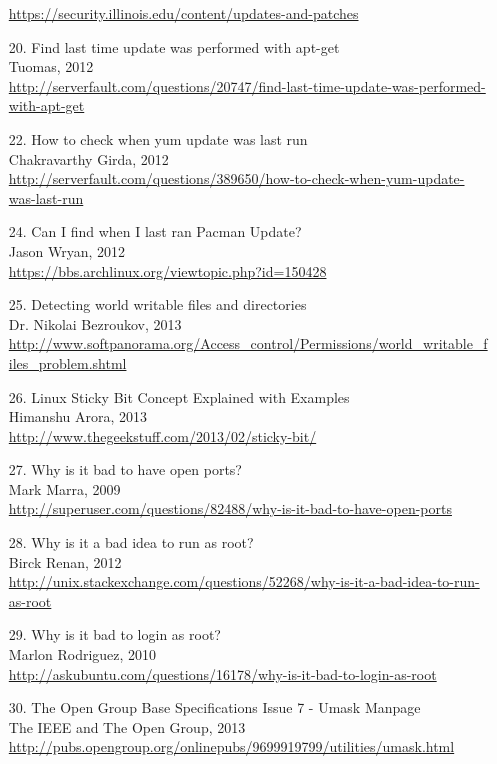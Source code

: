 \documentclass[a4paper,12pt]{article}
\begin{document}
\begin{sloppypar}
\begin{enumerate}
	\url{https://security.illinois.edu/content/updates-and-patches}
\item [20.] Find last time update was performed with apt-get \\ 
	Tuomas, 2012 \\
	\url{http://serverfault.com/questions/20747/find-last-time-update-was-performed-with-apt-get}
\item [22.] How to check when yum update was last run \\ 
	Chakravarthy Girda, 2012 \\
	\url{http://serverfault.com/questions/389650/how-to-check-when-yum-update-was-last-run}
\item [24.] Can I find when I last ran Pacman Update? \\ 
	Jason Wryan, 2012 \\
	\url{https://bbs.archlinux.org/viewtopic.php?id=150428}
\item [25.] Detecting world writable files and directories \\
	Dr. Nikolai Bezroukov, 2013 \\ 
	\url{http://www.softpanorama.org/Access\_control/Permissions/world\_writable\_files\_problem.shtml}
\item [26.] Linux Sticky Bit Concept Explained with Examples \\ 
	Himanshu Arora, 2013 \\
	\url{http://www.thegeekstuff.com/2013/02/sticky-bit/}
\item [27.] Why is it bad to have open ports? \\ 
	Mark Marra, 2009 \\
	\url{http://superuser.com/questions/82488/why-is-it-bad-to-have-open-ports}
\item [28.] Why is it a bad idea to run as root? \\ 
	Birck Renan, 2012 \\
	\url{http://unix.stackexchange.com/questions/52268/why-is-it-a-bad-idea-to-run-as-root}
\item [29.] Why is it bad to login as root? \\ 
	Marlon Rodriguez, 2010 \\
	\url{http://askubuntu.com/questions/16178/why-is-it-bad-to-login-as-root}
\item [30.] The Open Group Base Specifications Issue 7 - Umask Manpage \\ 
	The IEEE and The Open Group, 2013 \\
	\url{http://pubs.opengroup.org/onlinepubs/9699919799/utilities/umask.html}

\end{enumerate}
\end{sloppypar}
\end{document}
